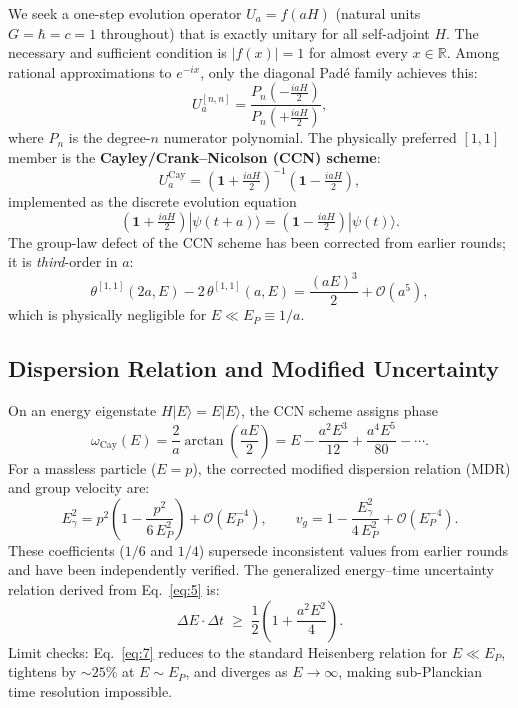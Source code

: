 \documentclass[11pt,a4paper]{article}
\begin{document}
We seek a one-step evolution operator $U_a = f(aH)$ (natural units $G = \hbar = c = 1$ throughout) that is exactly unitary for all self-adjoint $H$. The necessary and sufficient condition is $|f(x)| = 1$ for almost every $x \in \mathbb{R}$. Among rational approximations to $e^{-ix}$, only the diagonal Pad\'{e} family achieves this:
\begin{equation}
  U_a^{[n,n]} = \frac{P_n\!\left(-\tfrac{ia H}{2}\right)}{P_n\!\left(+\tfrac{ia H}{2}\right)},
  \label{eq:1}
\end{equation}
where $P_n$ is the degree-$n$ numerator polynomial. The physically preferred $[1,1]$ member is the \textbf{Cayley/Crank--Nicolson (CCN) scheme}:
\begin{equation}
  U_a^{\mathrm{Cay}} = \left(\mathbf{1} + \tfrac{ia H}{2}\right)^{-1}\!\left(\mathbf{1} - \tfrac{ia H}{2}\right),
  \label{eq:2}
\end{equation}
implemented as the discrete evolution equation
\begin{equation}
  \left(\mathbf{1} + \tfrac{ia H}{2}\right)|\psi(t+a)\rangle = \left(\mathbf{1} - \tfrac{ia H}{2}\right)|\psi(t)\rangle.
  \label{eq:3}
\end{equation}
The group-law defect of the CCN scheme has been corrected from earlier rounds; it is \emph{third}-order in $a$:
\begin{equation}
  \theta^{[1,1]}(2a,E) - 2\,\theta^{[1,1]}(a,E) = \frac{(aE)^3}{2} + \mathcal{O}(a^5),
  \label{eq:4}
\end{equation}
which is physically negligible for $E \ll E_P \equiv 1/a$.

\subsection{Dispersion Relation and Modified Uncertainty}

On an energy eigenstate $H|E\rangle = E|E\rangle$, the CCN scheme assigns phase
\begin{equation}
  \omega_{\mathrm{Cay}}(E) = \frac{2}{a}\arctan\!\left(\frac{aE}{2}\right)
  = E - \frac{a^2 E^3}{12} + \frac{a^4 E^5}{80} - \cdots.
  \label{eq:5}
\end{equation}
For a massless particle ($E = p$), the corrected modified dispersion relation (MDR) and group velocity are:
\begin{equation}
  E_\gamma^2 = p^2\!\left(1 - \frac{p^2}{6\,E_P^2}\right) + \mathcal{O}(E_P^{-4}),
  \qquad
  v_g = 1 - \frac{E_\gamma^2}{4\,E_P^2} + \mathcal{O}(E_P^{-4}).
  \label{eq:6}
\end{equation}
These coefficients ($1/6$ and $1/4$) supersede inconsistent values from earlier rounds and have been independently verified. The generalized energy--time uncertainty relation derived from Eq.~\eqref{eq:5} is:
\begin{equation}
  \Delta E \cdot \Delta t \;\geq\; \frac{1}{2}\!\left(1 + \frac{a^2 E^2}{4}\right).
  \label{eq:7}
\end{equation}
Limit checks: Eq.~\eqref{eq:7} reduces to the standard Heisenberg relation for $E \ll E_P$, tightens by $\sim 25\%$ at $E \sim E_P$, and diverges as $E \to \infty$, making sub-Planckian time resolution impossible.
\end{document}
